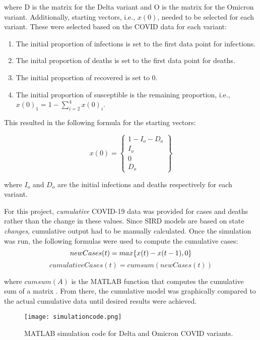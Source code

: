 \documentclass[conference]{IEEEtran}
\begin{document}
where D is the matrix for the Delta variant and O is the matrix for the Omicron variant. Additionally, starting vectors, i.e., $x(0)$, needed to be selected for each variant. These were selected based on the COVID data for each variant:
\begin{enumerate}
  \item The initial proportion of infections is set to the first data point for infections.
  \item The inital proportion of deaths is set to the first data point for deaths.
  \item The initial proportion of recovered is set to $0$.
  \item The initial proportion of susceptible is the remaining proportion, i.e., $x(0)_1 = 1 - \sum_{i=2}^{4}x(0)_{i}$.
\end{enumerate}

This resulted in the following formula for the starting vectors:

\begin{equation}
x(0) = \begin{Bmatrix}
1 - I_o - D_o \\
I_o \\
0 \\
D_o
\end{Bmatrix}
\end{equation}

where $I_o$ and $D_o$ are the initial infections and deaths respectively for each variant.

For this project, \textit{cumulative} COVID-19 data was provided for cases and deaths rather than the change in these values. Since SIRD models are based on state \textit{changes}, cumulative output had to be manually calculated. Once the simulation was run, the following formulas were used to compute the cumulative cases:
\begin{equation}
  newCases(t) = max\{x(t) - x(t - 1), 0\} \\
\end{equation}
\begin{equation}
  cumulativeCases(t) = cumsum(newCases(t))
\end{equation}

where $cumsum(A)$ is the MATLAB function that computes the cumulative sum of a matrix \cite{cumsum}. From there, the cumulative model was graphically compared to the actual cumulative data until desired results were achieved.

\begin{figure}[htbp]
  \centerline{\texttt{[image: simulationcode.png]}}
  \caption{MATLAB simulation code for Delta and Omicron COVID variants.}
  \label{fig:sim_code_delta_om}
\end{figure}  
\end{document}
